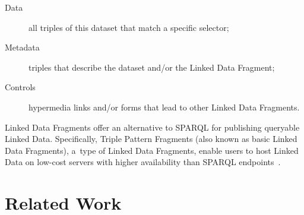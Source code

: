 \documentclass[letterpaper]{article}
\begin{document}
\begin{description}
  \item[Data] all triples of this dataset that match a specific selector;
  \item[Metadata] triples that describe the dataset and/or the Linked Data Fragment;
  \item[Controls] hypermedia links and/or forms that lead to other Linked Data Fragments.
\end{description}

Linked Data Fragments offer an alternative
to SPARQL for publishing queryable Linked Data.
Specifically, Triple Pattern Fragments
(also known as basic Linked Data Fragments),
a~type of Linked Data Fragments, enable users to host Linked Data
on low-cost servers with higher availability
than SPARQL endpoints~\cite{DBLP:conf/semweb/MatteisV14}.

\section{Related Work}
\end{document}
